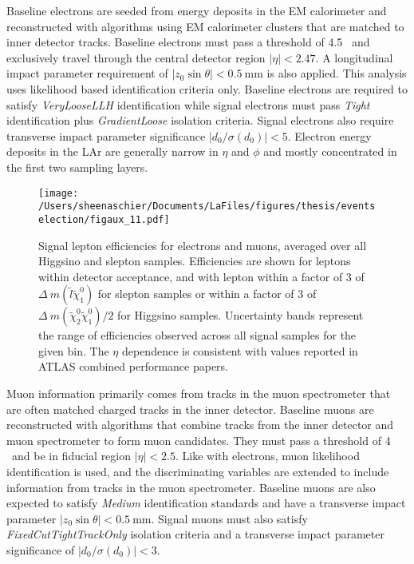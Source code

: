 Baseline electrons are seeded from energy deposits in the EM calorimeter and reconstructed with algorithms using EM calorimeter clusters that are matched to inner detector tracks.  Baseline electrons must pass a \pt{} threshold of 4.5 \GeV~and exclusively travel through the central detector region $|\eta | < 2.47$.  A longitudinal impact parameter requirement of $|z_0\sin\theta| < 0.5~\mathrm{mm}$ is also applied.  This analysis uses likelihood based identification criteria only.  Baseline electrons are required to satisfy \textit{VeryLooseLLH} identification while signal electrons must pass \textit{Tight} identification plus \textit{GradientLoose} isolation criteria.  Signal electrons also require transverse impact parameter significance $|d_0/\sigma(d_0)| < 5$.  Electron energy deposits in the LAr are generally narrow in $\eta$ and $\phi$ and mostly concentrated in the first two sampling layers.
\begin{figure}[h!]
 \centering
 \texttt{[image: /Users/sheenaschier/Documents/LaFiles/figures/thesis/eventselection/figaux\_11.pdf]}
 \caption{Signal lepton efficiencies for electrons and muons, averaged over all Higgsino and slepton samples. Efficiencies are shown for leptons within detector acceptance, and with lepton \pt within a factor of 3 of $\Delta~m(\tilde l\tilde\chi_1^0)$ for slepton samples or within a factor of 3 of $\Delta~m(\tilde \chi_2^0\tilde\chi_1^0)/2$ for Higgsino samples. Uncertainty bands represent the range of efficiencies observed across all signal samples for the given \pt bin.  The $\eta$ dependence is consistent with values reported in ATLAS combined performance papers.}
 \label{fig:sigeff}
 \end{figure}
 
Muon information primarily comes from tracks in the muon spectrometer that are often matched charged tracks in the inner detector.  Baseline muons are reconstructed with algorithms that combine tracks from the inner detector and muon spectrometer to form muon candidates.  They must pass a \pt{} threshold of 4 \GeV~and be in fiducial region $|\eta | < 2.5$. Like with electrons, muon likelihood identification is used, and the discriminating variables are extended to include information from tracks in the muon spectrometer.  Baseline muons are also expected to satisfy \textit{Medium} identification standards  and have a transverse impact parameter $|z_0\sin\theta| < 0.5~\mathrm{mm}$.  Signal muons must also satisfy \textit{FixedCutTightTrackOnly} isolation criteria and a transverse impact parameter significance of $|d_0/\sigma(d_0)| < 3$.

